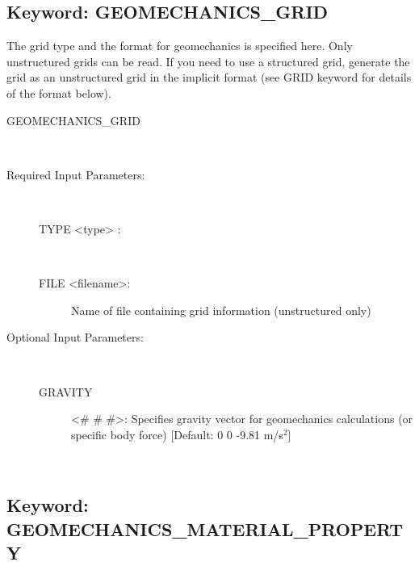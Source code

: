 
\newpage
\protect\hypertarget{target_geomech_grid}{}
 
\subsection{Keyword: GEOMECHANICS\_GRID}

\hfill\hyperlink{target_key}{\return}

 The grid type and the format for geomechanics is specified here.
Only unstructured grids can be read. If you need to use a structured grid, generate the grid as an unstructured grid in the implicit format (see GRID keyword for details of the format below).

\begin{description}
\item[GEOMECHANICS\_GRID]~
\item[Required Input Parameters:]~

\begin{description}
\item[TYPE <type> :] ~


\item[FILE <filename>:] Name of file containing grid information (unstructured only)

\end{description}

\item[Optional Input Parameters:]~
\begin{description}
\item[GRAVITY] <\# \# \#>: Specifies gravity vector for geomechanics calculations (or specific body force) [Default: 0 0 -9.81 m/s$^2$] 
\end{description}


\item[\keyend] ~

\end{description}


\newpage
\protect\hypertarget{target_geomech_material_prop}{}
 
\subsection{Keyword: GEOMECHANICS\_MATERIAL\_PROPERTY}

